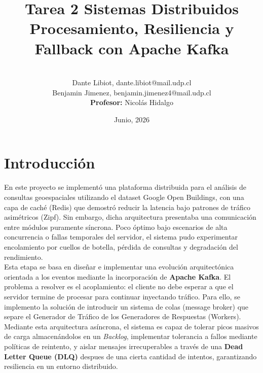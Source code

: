 \documentclass[letter,12pt]{article}
\begin{document}
\title{\Huge{Tarea 2 Sistemas Distribuidos} \\
  \large Procesamiento, Resiliencia y Fallback con Apache Kafka}
\author{\\Dante Libiot, dante.libiot@mail.udp.cl\\ Benjamin Jimenez, benjamin.jimenez4@mail.udp.cl \\ \textbf{Profesor: } Nicolás Hidalgo}
\date{Junio, 2026}
\maketitle

\newpage
\tableofcontents
\newpage

\section{Introducción}
En este proyecto se implementó una plataforma distribuida para el análisis de consultas geoespaciales utilizando el dataset Google Open Buildings, con una capa de caché (Redis) que demostró reducir la latencia bajo patrones de tráfico asimétricos (Zipf). Sin embargo, dicha arquitectura presentaba una comunicación entre módulos puramente síncrona. Poco óptimo bajo escenarios de alta concurrencia o fallas temporales del servidor, el sistema pudo experimentar encolamiento por cuellos de botella, pérdida de consultas y degradación del rendimiento.
\\
Esta etapa se basa en diseñar e implementar una evolución arquitectónica orientada a los eventos mediante la incorporación de \textbf{Apache Kafka}. El problema a resolver es el acoplamiento: el cliente no debe esperar a que el servidor termine de procesar para continuar inyectando tráfico. Para ello, se implemento la solución de introducir un sistema de colas (message broker) que separe el Generador de Tráfico de los Generadores de Respuestas (Workers).
\\
Mediante esta arquitectura asíncrona, el sistema es capaz de tolerar picos masivos de carga almacenándolos en un \textit{Backlog}, implementar tolerancia a fallos mediante políticas de reintento, y aislar mensajes irrecuperables a través de una \textbf{Dead Letter Queue (DLQ)} despues de una cierta cantidad de intentos, garantizando resiliencia en un entorno distribuido.

\end{document}
